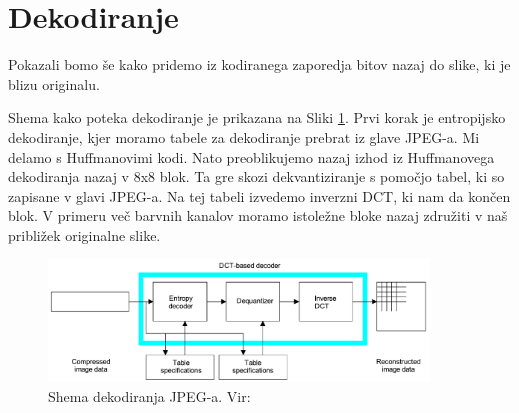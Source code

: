 \documentclass[a4paper,12pt,openright]{book}
\begin{document}
\section{Dekodiranje}
Pokazali bomo še kako pridemo iz kodiranega zaporedja bitov nazaj do slike, ki je blizu originalu.\par
Shema kako poteka dekodiranje je prikazana na Sliki \ref{Shema_dekodiranja_JPEG}. Prvi korak je entropijsko dekodiranje, kjer moramo tabele za dekodiranje prebrat iz glave JPEG-a. Mi delamo s Huffmanovimi kodi. Nato preoblikujemo nazaj izhod iz Huffmanovega dekodiranja nazaj v 8x8 blok. Ta gre skozi dekvantiziranje s pomočjo tabel, ki so zapisane v glavi JPEG-a. Na tej tabeli izvedemo inverzni DCT, ki nam da končen blok. V primeru več barvnih kanalov moramo istoležne bloke nazaj združiti v naš približek originalne slike.\par
\begin{figure}[ht] %
\begin{center}
\includegraphics[width=0.9\textwidth]{slike/Shema_Inverz_JPEG.pdf}
\end{center}
\caption{Shema dekodiranja JPEG-a. Vir:~\cite{ISO/IEC_10918-1}}
\label{Shema_dekodiranja_JPEG}
\end{figure}
\end{document}
